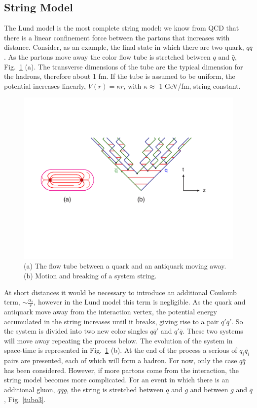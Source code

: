 \subsection*{String Model}
The Lund model is the most complete string model: we know from QCD that there is a linear confinement force between the partons that increases with distance. Consider, as an example, the final state in which there are two quark, $ q \bar{q} $. As the partons move away the color flow tube is stretched between $ q $ and $ \bar{q} $, Fig.~\ref{tubo} (a). The transverse dimensions of the tube are the typical dimension for the hadrons, therefore  about 1 fm.
If the tube is assumed to be uniform, the potential increases linearly, $ V (r) = \kappa r $, with $ \kappa \approx $ 1 GeV/fm, string constant.
\begin{figure}
\centering
\includegraphics[scale= 0.5]{../Cap3/Fig_MC/stringone}
\caption{(a) The flow tube between a quark and an antiquark moving away. (b) Motion and breaking of a system string.}
\label{tubo}
\end{figure}
At short distances it would be necessary to introduce an additional Coulomb term, $ \sim \frac{\alpha_s}{r} $, however in the Lund model this term is  negligible.
As the quark and antiquark move away from the interaction vertex, the potential energy accumulated in the string increases until it breaks, giving rise to a pair $ q'  \bar{q}' $. So the system is divided into two new color singles $ q \bar{q} '$ and $ q' \bar{q} $. These two systems will move away  repeating the process below. The evolution of the system in space-time is represented in Fig.~\ref{tubo} (b).
At the end of the process  a serious of  $ q_i \bar{q_i} $ pairs are presented, each of which will form a hadron.
For now, only the case $ q \bar{q} $ has been considered. However, if more partons come from the interaction, the string model becomes more complicated. For an event in which there is an additional gluon, $ q \bar{q} g $, the string is stretched between $ q $ and $ g $ and between $ g $ and $ \bar{q} $, Fig. \ref{tubo3}.


